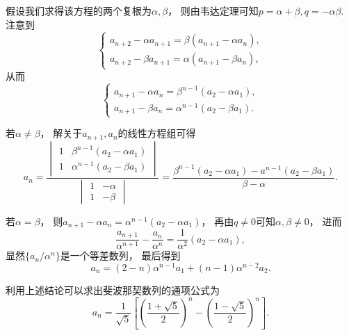 假设我们求得该方程的两个复根为\(\alpha,\beta\)，
则由韦达定理可知\(p=\alpha+\beta, q=-\alpha\beta\).
注意到\begin{equation*}
	\left\{ \begin{array}{l}
		a_{n+2} - \alpha a_{n+1} = \beta(a_{n+1}-\alpha a_n), \\
		a_{n+2} - \beta a_{n+1} = \alpha(a_{n+1}-\beta a_n),
	\end{array} \right.
\end{equation*}
从而\begin{equation*}
	\left\{ \begin{array}{l}
		a_{n+1} - \alpha a_n = \beta^{n-1} (a_2 - \alpha a_1), \\
		a_{n+1} - \beta a_n = \alpha^{n-1} (a_2 - \beta a_1).
	\end{array} \right.
\end{equation*}

若\(\alpha\neq\beta\)，
解关于\(a_{n+1},a_n\)的线性方程组可得\begin{equation*}
	a_n
	= \frac
		{
			\begin{vmatrix}
				1 & \beta^{n-1}(a_2 - \alpha a_1) \\
				1 & \alpha^{n-1}(a_2 - \beta a_1)
			\end{vmatrix}
		}
		{
			\begin{vmatrix}
				1 & -\alpha \\
				1 & -\beta
			\end{vmatrix}
		}
	= \frac{\beta^{n-1} (a_2 - \alpha a_1) - a^{n-1} (a_2 - \beta a_1)}{\beta-\alpha}.
\end{equation*}

若\(\alpha=\beta\)，
则\(a_{n+1} - \alpha a_n = \alpha^{n-1} (a_2 - \alpha a_1)\)，
再由\(q\neq0\)可知\(\alpha,\beta\neq0\)，
进而\begin{equation*}
	\frac{a_{n+1}}{\alpha^{n+1}} - \frac{a_n}{\alpha^n}
	= \frac{1}{\alpha^2}(a_2-\alpha a_1),
\end{equation*}
显然\(\{a_n/\alpha^n\}\)是一个等差数列，
最后得到\begin{equation*}
	a_n = (2-n)\alpha^{n-1} a_1 + (n-1) \alpha^{n-2} a_2.
\end{equation*}

利用上述结论可以求出斐波那契数列的通项公式为\begin{equation*}
	a_n = \frac{1}{\sqrt{5}} \left[
		\left(\frac{1+\sqrt{5}}{2}\right)^n
		-\left(\frac{1-\sqrt{5}}{2}\right)^n
	\right].
\end{equation*}


